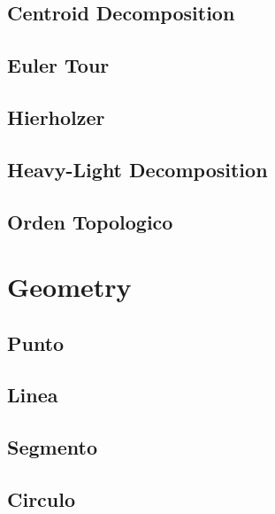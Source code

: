 \subsection{Centroid Decomposition}
\raggedbottom
\hrulefill
\subsection{Euler Tour}
\raggedbottom
\hrulefill
\subsection{Hierholzer}
\raggedbottom
\hrulefill
\subsection{Heavy-Light Decomposition}
\raggedbottom
\hrulefill
\subsection{Orden Topologico}
\raggedbottom
\hrulefill
\newpage

\section{Geometry}
\subsection{Punto}
\raggedbottom
\hrulefill
\subsection{Linea}
\raggedbottom
\hrulefill
\subsection{Segmento}
\raggedbottom
\hrulefill
\subsection{Circulo}
\raggedbottom
\hrulefill
